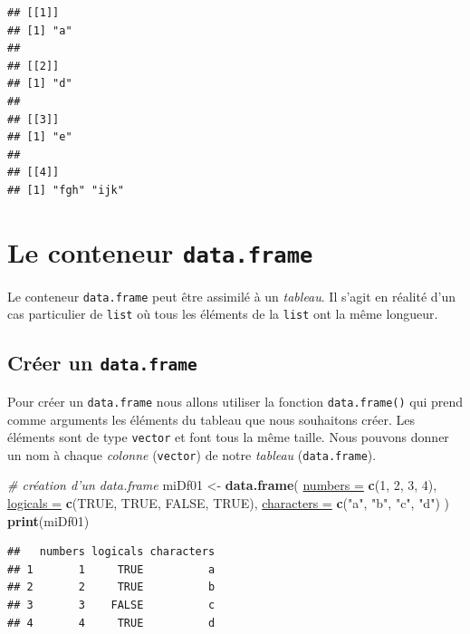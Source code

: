 \documentclass[twoside,symmetric]{book}
\newenvironment{Shaded}{}{}
\newcommand{\CommentTok}[1]{\textit{#1}}
\newcommand{\DataTypeTok}[1]{\underline{#1}}
\newcommand{\DecValTok}[1]{#1}
\newcommand{\KeywordTok}[1]{\textbf{#1}}
\newcommand{\NormalTok}[1]{#1}
\newcommand{\OtherTok}[1]{#1}
\newcommand{\StringTok}[1]{#1}
\begin{document}
\begin{verbatim}
## [[1]]
## [1] "a"
## 
## [[2]]
## [1] "d"
## 
## [[3]]
## [1] "e"
## 
## [[4]]
## [1] "fgh" "ijk"
\end{verbatim}

\hypertarget{l014dataframe}{%
\section{\texorpdfstring{Le conteneur \texttt{data.frame}}{Le conteneur data.frame}}\label{l014dataframe}}

Le conteneur \texttt{data.frame} peut être assimilé à un \emph{tableau}. Il s'agit en réalité d'un cas particulier de \texttt{list} où tous les éléments de la \texttt{list} ont la même longueur.

\hypertarget{cruxe9er-un-data.frame}{%
\subsection{\texorpdfstring{Créer un \texttt{data.frame}}{Créer un data.frame}}\label{cruxe9er-un-data.frame}}

Pour créer un \texttt{data.frame} nous allons utiliser la fonction \texttt{data.frame()} qui prend comme arguments les éléments du tableau que nous souhaitons créer. Les éléments sont de type \texttt{vector} et font tous la même taille. Nous pouvons donner un nom à chaque \emph{colonne} (\texttt{vector}) de notre \emph{tableau} (\texttt{data.frame}).

\begin{Shaded}
\begin{Highlighting}[]
\CommentTok{# création d'un data.frame }
\NormalTok{miDf01 <-}\StringTok{ }\KeywordTok{data.frame}\NormalTok{(}
  \DataTypeTok{numbers =} \KeywordTok{c}\NormalTok{(}\DecValTok{1}\NormalTok{, }\DecValTok{2}\NormalTok{, }\DecValTok{3}\NormalTok{, }\DecValTok{4}\NormalTok{), }
  \DataTypeTok{logicals =} \KeywordTok{c}\NormalTok{(}\OtherTok{TRUE}\NormalTok{, }\OtherTok{TRUE}\NormalTok{, }\OtherTok{FALSE}\NormalTok{, }\OtherTok{TRUE}\NormalTok{), }
  \DataTypeTok{characters =} \KeywordTok{c}\NormalTok{(}\StringTok{"a"}\NormalTok{, }\StringTok{"b"}\NormalTok{, }\StringTok{"c"}\NormalTok{, }\StringTok{"d"}\NormalTok{)}
\NormalTok{)}
\KeywordTok{print}\NormalTok{(miDf01)}
\end{Highlighting}
\end{Shaded}

\begin{verbatim}
##   numbers logicals characters
## 1       1     TRUE          a
## 2       2     TRUE          b
## 3       3    FALSE          c
## 4       4     TRUE          d
\end{verbatim}
\end{document}
